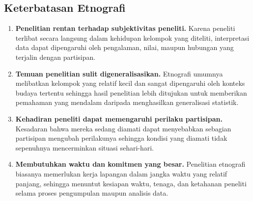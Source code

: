 \documentclass[
  indonesian,
  letterpaper,
  DIV=11,
  numbers=noendperiod]{scrreprt}
\providecommand{\tightlist}{%
  \setlength{\itemsep}{0pt}\setlength{\parskip}{0pt}}
\begin{document}
\subsection{Keterbatasan Etnografi}\label{keterbatasan-etnografi}

\begin{enumerate}
\def\labelenumi{\arabic{enumi}.}
\tightlist
\item
  \textbf{Penelitian rentan terhadap subjektivitas peneliti.} Karena
  peneliti terlibat secara langsung dalam kehidupan kelompok yang
  diteliti, interpretasi data dapat dipengaruhi oleh pengalaman, nilai,
  maupun hubungan yang terjalin dengan partisipan.
\item
  \textbf{Temuan penelitian sulit digeneralisasikan.} Etnografi umumnya
  melibatkan kelompok yang relatif kecil dan sangat dipengaruhi oleh
  konteks budaya tertentu sehingga hasil penelitian lebih ditujukan
  untuk memberikan pemahaman yang mendalam daripada menghasilkan
  generalisasi statistik.
\item
  \textbf{Kehadiran peneliti dapat memengaruhi perilaku partisipan.}
  Kesadaran bahwa mereka sedang diamati dapat menyebabkan sebagian
  partisipan mengubah perilakunya sehingga kondisi yang diamati tidak
  sepenuhnya mencerminkan situasi sehari-hari.
\item
  \textbf{Membutuhkan waktu dan komitmen yang besar.} Penelitian
  etnografi biasanya memerlukan kerja lapangan dalam jangka waktu yang
  relatif panjang, sehingga menuntut kesiapan waktu, tenaga, dan
  ketahanan peneliti selama proses pengumpulan maupun analisis data.
\end{enumerate}
\end{document}
